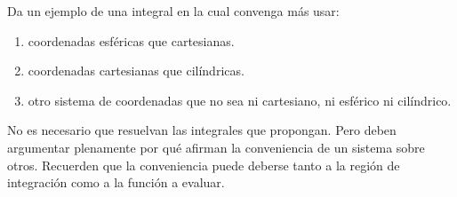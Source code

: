 \begin{ejercicio}
    Da un ejemplo de una integral en la cual convenga más usar:

\begin{enumerate}
    \item[(a)] coordenadas esféricas que cartesianas.
    \item[(b)] coordenadas cartesianas que cilíndricas.
    \item[(c)] otro sistema de coordenadas que no sea ni cartesiano, ni esférico ni cilíndrico.
\end{enumerate}

No es necesario que resuelvan las integrales que propongan. Pero deben argumentar plenamente por qué afirman la conveniencia de un sistema sobre otros. Recuerden que la conveniencia puede deberse tanto a la región de integración como a la función a evaluar.
\end{ejercicio}

